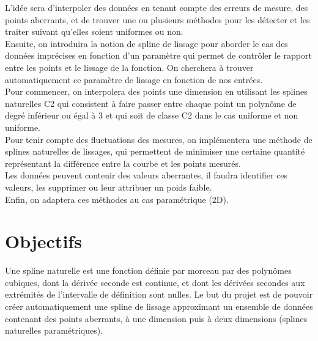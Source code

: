 \documentclass[a4paper,12pt]{article}
\begin{document}
L'idée sera d'interpoler des données en tenant compte des erreurs de mesure, des points aberrants, et de trouver une ou plusieurs méthodes pour les détecter et les traiter suivant qu’elles soient uniformes ou non.
\\

Ensuite, on introduira la notion de spline de lissage pour aborder le cas des données imprécises en fonction d’un paramètre qui permet de contrôler le rapport entre les points et le lissage de la fonction. On cherchera à trouver automatiquement ce paramètre de lissage en fonction de nos entrées.
\\

Pour commencer, on interpolera des points une dimension en utilisant les splines naturelles C2 qui consistent à faire passer entre chaque point un polynôme de degré inférieur ou égal à 3 et qui soit de classe C2 dans le cas uniforme et non uniforme.
\\

Pour tenir compte des fluctuations des mesures, on implémentera une méthode de splines naturelles de lissages, qui permettent de minimiser une certaine quantité représentant la différence entre la courbe et les points mesurés.
\\

Les données peuvent contenir des valeurs aberrantes, il faudra identifier ces valeurs, les supprimer ou leur attribuer un poids faible.
\\

Enfin, on adaptera ces méthodes au cas paramétrique (2D).

\newpage
\section{Objectifs}


Une spline naturelle est une fonction définie par morceau par des polynômes cubiques, dont la dérivée seconde est continue, et dont les dérivées secondes aux extrémités de l'intervalle de définition sont nulles.
Le but du projet est de pouvoir créer automatiquement une spline de lissage approximant un ensemble de données contenant des points aberrants, à une dimension puis à deux dimensions (splines naturelles paramétriques).
\end{document}
